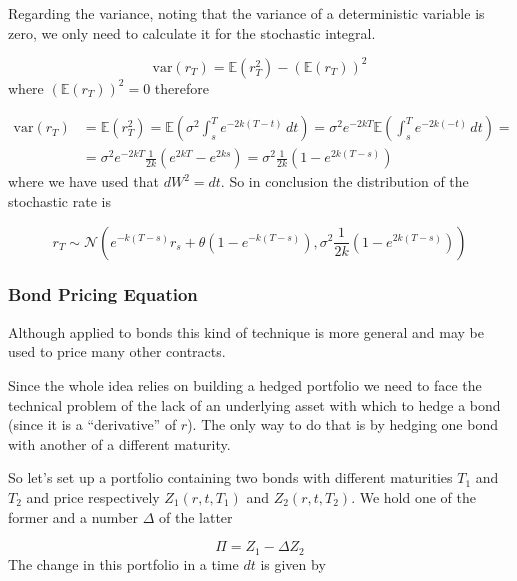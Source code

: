 Regarding the variance, noting that the variance of a deterministic variable is zero, we only need to calculate it for the stochastic integral. %

\begin{equation*}
\textrm{var}(r_T)=\mathbb{E}(r^2_T)-(\mathbb{E}(r_T))^2
\end{equation*}
where $(\mathbb{E}(r_T))^2 = 0$ therefore

\begin{equation}
\begin{aligned}
\textrm{var}(r_T)&=\mathbb{E}(r^2_T)=\mathbb{E}(\sigma^2 \int^T_s e^{-2k(T-t)}\,dt)=\sigma^2 e^{-2kT} \mathbb{E}( \int^T_s e^{-2k(-t)}\,dt)=\\
&=\sigma^2 e^{-2kT} \frac {1}{2k}(e^{2kT}-e^{2ks})=\sigma^2 \frac {1}{2k}(1-e^{2k(T-s)}) 
\end{aligned}
\end{equation}
where we have used that $dW^2 = dt$.
So in conclusion the distribution of the stochastic rate is

\begin{equation}
r_T \sim \mathcal{N}(e^{-k(T-s)} r_s+\theta(1-e^{-k(T-s)}),\sigma^2 \frac {1}{2k}(1-e^{2k(T-s)}))
\end{equation}

\subsubsection{Bond Pricing Equation}\label{bond-pricing-equation}

Although applied to bonds this kind of technique is more general and may be used to price many other contracts.

Since the whole idea relies on building a hedged portfolio we need to face the technical problem of the lack of an underlying asset with which
to hedge a bond (since it is a ``derivative'' of $r$). The only way to do that is by hedging one bond with another of a different maturity.

So let's set up a portfolio containing two bonds with different maturities $T_1$ and $T_2$ and price respectively $Z_1(r, t, T_1)$
and $Z_2(r, t, T_2)$. We hold one of the former and a number $\Delta$ of the latter

\begin{equation*}
\Pi = Z_1 − \Delta Z_2
\end{equation*}
The change in this portfolio in a time $dt$ is given by

